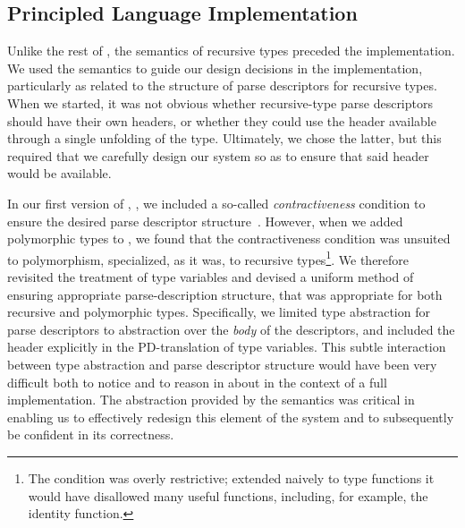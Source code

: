 
\subsection{Principled Language Implementation}

Unlike the rest of \padsc{}, the semantics of recursive types preceded
the implementation. We used the semantics to guide our design
decisions in the implementation, particularly as related to the structure of parse descriptors for recursive types. When we started, it was not obvious whether recursive-type parse descriptors should have their own headers, or whether they could use the header available through a single unfolding of the type. Ultimately, we chose the latter, but this required that we carefully design our system so as to ensure that said header would be available. 

In our first version of \ddc{}, \ddcold{}, we included a so-called \textit{contractiveness} condition to ensure the desired parse descriptor structure~\cite{fisher+:popl06}. However, when we added polymorphic types to \ddcold{}, we found that the contractiveness condition was unsuited to polymorphism, specialized, as it was, to recursive types\footnote{The condition was overly restrictive; extended naively to type functions it would have disallowed many useful functions, including, for example, the identity function.}. We therefore revisited the treatment of type variables and devised a uniform method of ensuring appropriate parse-description structure, that was appropriate for both recursive and polymorphic types. Specifically, we limited type abstraction for parse descriptors to abstraction over the \textit{body} of the descriptors, and included the header explicitly in the PD-translation of type variables. This subtle interaction between type abstraction and parse descriptor structure would have been very difficult both to notice and to reason in about in the context of a full implementation. The abstraction provided by the semantics was critical in enabling us to effectively redesign this element of the system and to subsequently be confident in its correctness.

